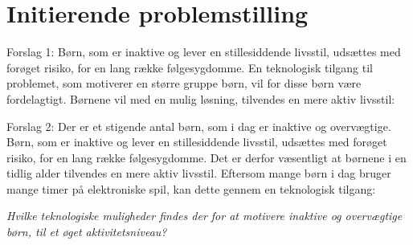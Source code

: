 \section{Initierende problemstilling}
Forslag 1: 
Børn, som er inaktive og lever en stillesiddende livsstil, udsættes med forøget risiko, for en lang række følgesygdomme. En teknologisk tilgang til problemet, som motiverer en større gruppe børn, vil for disse børn være fordelagtigt. Børnene vil med en mulig løsning, tilvendes en mere aktiv livsstil: 

Forslag 2: 
Der er et stigende antal børn, som i dag er inaktive og overvægtige. Børn, som er inaktive og lever en stillesiddende livsstil, udsættes med forøget risiko, for en lang række følgesygdomme. Det er derfor væsentligt at børnene i en tidlig alder tilvendes en mere aktiv livsstil. Eftersom mange børn i dag bruger mange timer på elektroniske spil, kan dette gennem en teknologisk tilgang:

\begin{center}
\textit{Hvilke teknologiske muligheder findes der for at motivere inaktive og overvægtige børn, til et øget aktivitetsniveau?}
\end{center}